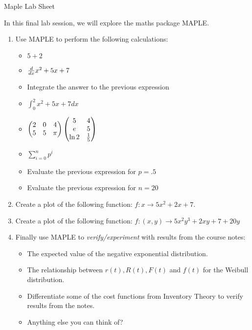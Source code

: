 \documentclass[12pt]{article}
\begin{document}
\begin{center}
\Huge{Maple Lab Sheet}
\end{center}

In this final lab session, we will explore the maths package MAPLE.\\

\begin{enumerate}
\item Use MAPLE to perform the following calculations:
    \begin{itemize}
        \item $5+2$
        \item ${d\over dx}{x^2+5x+7}$
        \item Integrate the answer to the previous expression
        \item $\int_{0}^2{x^2+5x+7}dx$
        \item $\begin{pmatrix}2&0&4\\5&5&\pi\end{pmatrix}\begin{pmatrix}5&4\\e&5\\\ln2&1\over5\end{pmatrix}$
        \item $\sum_{i=0}^{n}p^i$
        \item Evaluate the previous expression for $p=.5$
        \item Evaluate the previous expression for $n=20$
    \end{itemize}
\item Create a plot of the following function: $f:x\to5x^2+2x+7$.
\item Create a plot of the following function: $f:(x,y)\to 5x^2y^3+2xy+7+20y$
\item Finally use MAPLE to \emph{verify/experiment} with results from the course notes:
    \begin{itemize}
        \item The expected value of the negative exponential distribution.
        \item The relationship between $r(t),R(t),F(t)$ and $f(t)$ for the Weibull distribution.
        \item Differentiate some of the cost functions from Inventory Theory to verify results from the notes.
        \item Anything else you can think of?
    \end{itemize}
\end{enumerate}
\end{document}

